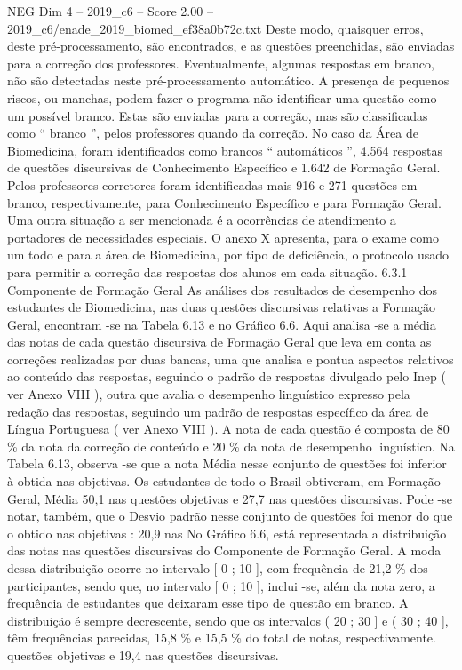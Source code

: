 \begin{textsample}{NEG Dim 4 – 2019\_c6 – Score 2.00 – 2019\_c6/enade\_2019\_biomed\_ef38a0b72c.txt}
Deste modo, quaisquer erros, deste pré-processamento, são encontrados, e as questões preenchidas, são enviadas para a correção dos professores.
Eventualmente, algumas respostas em branco, não são detectadas neste pré-processamento automático.
A presença de pequenos riscos, ou manchas, podem fazer o programa não identificar uma questão como um possível branco.
Estas são enviadas para a correção, mas são classificadas como “ branco ”, pelos professores quando da correção.
No caso da Área de Biomedicina, foram identificados como brancos “ automáticos ”, 4.564 respostas de questões discursivas de Conhecimento Específico e 1.642 de Formação Geral.
Pelos professores corretores foram identificadas mais 916 e 271 questões em branco, respectivamente, para Conhecimento Específico e para Formação Geral.
Uma outra situação a ser mencionada é a ocorrências de atendimento a portadores de necessidades especiais.
O anexo X apresenta, para o exame como um todo e para a área de Biomedicina, por tipo de deficiência, o protocolo usado para permitir a correção das respostas dos alunos em cada situação. 6.3.1 Componente de Formação Geral As análises dos resultados de desempenho dos estudantes de Biomedicina, nas duas questões discursivas relativas a Formação Geral, encontram -se na Tabela 6.13 e no Gráfico 6.6.
Aqui analisa -se a média das notas de cada questão discursiva de Formação Geral que leva em conta as correções realizadas por duas bancas, uma que analisa e pontua aspectos relativos ao conteúdo das respostas, seguindo o padrão de respostas divulgado pelo Inep ( ver Anexo VIII ), outra que avalia o desempenho linguístico expresso pela redação das respostas, seguindo um padrão de respostas específico da área de Língua Portuguesa ( ver Anexo VIII ).
A nota de cada questão é composta de 80 \% da nota da correção de conteúdo e 20 \% da nota de desempenho linguístico.
Na Tabela 6.13, observa -se que a nota Média nesse conjunto de questões foi inferior à obtida nas objetivas.
Os estudantes de todo o Brasil obtiveram, em Formação Geral, Média 50,1 nas questões objetivas e 27,7 nas questões discursivas.
Pode -se notar, também, que o Desvio padrão nesse conjunto de questões foi menor do que o obtido nas objetivas : 20,9 nas No Gráfico 6.6, está representada a distribuição das notas nas questões discursivas do Componente de Formação Geral.
A moda dessa distribuição ocorre no intervalo [ 0 ; 10 ], com frequência de 21,2 \% dos participantes, sendo que, no intervalo [ 0 ; 10 ], inclui -se, além da nota zero, a frequência de estudantes que deixaram esse tipo de questão em branco.
A distribuição é sempre decrescente, sendo que os intervalos ( 20 ; 30 ] e ( 30 ; 40 ], têm frequências parecidas, 15,8 \% e 15,5 \% do total de notas, respectivamente. questões objetivas e 19,4 nas questões discursivas.

\end{textsample}
